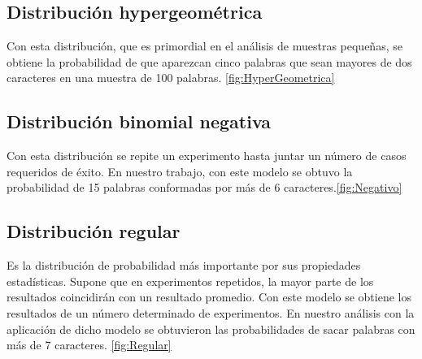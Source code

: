 \documentclass[]{article}
\begin{document}
\subsection{Distribución hypergeométrica}
Con esta distribución, que es primordial en el análisis de muestras pequeñas, se obtiene la probabilidad de que aparezcan cinco palabras que sean mayores de dos caracteres en una muestra de 100 palabras. \autoref{fig:HyperGeometrica}

\subsection{Distribución binomial negativa}
Con esta distribución se repite un experimento hasta juntar un número de casos requeridos de éxito. En nuestro trabajo, con este modelo se obtuvo la probabilidad de 15 palabras conformadas por más de 6 caracteres.\autoref{fig:Negativo}
\subsection{Distribución regular}
Es la distribución de probabilidad más importante por sus propiedades estadísticas. Supone que en experimentos repetidos, la mayor parte de los resultados coincidirán con un resultado promedio.
Con este modelo se obtiene los resultados de un número determinado de experimentos. En nuestro análisis con la aplicación de dicho modelo se obtuvieron las probabilidades de sacar palabras con más de 7 caracteres. \autoref{fig:Regular}
\end{document}
